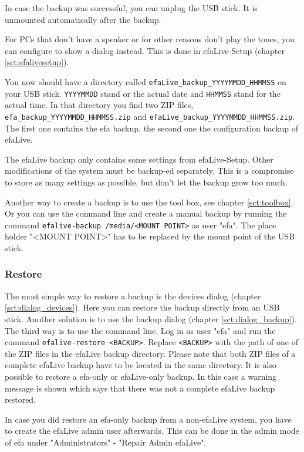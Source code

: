 \documentclass[a4paper,12pt,twoside]{article}
\begin{document}
In case the backup was successful, you can unplug the USB stick. It is
unmounted automatically after the backup.

For PCs that don't have a speaker or for other reasons
don't play the tones, you can configure to show a
dialog instead. This is done in efaLive-Setup (chapter \ref{sct:efalivesetup}).

You now should have a directory called
\texttt{efaLive\_backup\_YYYYMMDD\_HHMMSS} on your
USB stick. \texttt{YYYYMMDD} stand or the actual
date and \texttt{HHMMSS} stand for the actual
time. In that directory you find two ZIP files,
\texttt{efa\_backup\_YYYYMMDD\_HHMMSS.zip} and
\texttt{efaLive\_backup\_YYYYMMDD\_HHMMSS.zip}.
The first one contains the efa backup, the second one the configuration
backup of efaLive.

The efaLive backup only contains some settings from efaLive-Setup. Other
modifications of the system must be backup-ed separately. This is a
compromise to store as many settings as possible, but
don't let the backup grow too much.

Another way to create a backup is to use the tool box, see chapter 
\ref{sct:toolbox}. Or you can use the command line and create a manual 
backup by running the command \texttt{efalive-backup 
/media/{\textless}MOUNT POINT{\textgreater}} as user "efa". The place 
holder "{\textless}MOUNT POINT{\textgreater}" has to be replaced by the 
mount point of the USB stick.


\subsubsection{Restore}
\label{sct:restore}
The most simple way to restore a backup is the devices dialog (chapter
\ref{sct:dialog_devices}). Here you can restore the backup directly from an USB stick.
Another solution is to use the backup dialog (chapter \ref{sct:dialog_backup}). The third
way is to use the command line. Log in as user
"efa" and run the command
\texttt{efalive-restore {\textless}BACKUP{\textgreater}}. Replace
\texttt{{\textless}BACKUP{\textgreater}} with the
path of one of the ZIP files in the efaLive backup directory. Please
note that both ZIP files of a complete efaLive backup have to be located in the
same directory. It is also possible to restore a efa-only or efaLive-only backup.
In this case a warning message is shown which says that there was not a complete
efaLive backup restored.

In case you did restore an efa-only backup from a non-efaLive system, you have
to create the efaLive admin user afterwards. This can be done in the admin mode
of efa under "Administrators" - "Repair Admin efaLive".
\end{document}
